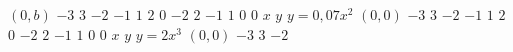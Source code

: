 \documentclass{article}
\begin{document}
$(0,b)$%
\stopmpxshipout
\mpxshipout%
$\num{-3}$%
\stopmpxshipout
\mpxshipout%
$\num{3}$%
\stopmpxshipout
\mpxshipout%
$\num{-2}$%
\stopmpxshipout
\mpxshipout%
$\num{-1}$%
\stopmpxshipout
\mpxshipout%
$\num{1}$%
\stopmpxshipout
\mpxshipout%
$\num{2}$%
\stopmpxshipout
\mpxshipout%
$\num{0}$%
\stopmpxshipout
\mpxshipout%
$\num{-2}$%
\stopmpxshipout
\mpxshipout%
$\num{2}$%
\stopmpxshipout
\mpxshipout%
$\num{-1}$%
\stopmpxshipout
\mpxshipout%
$\num{1}$%
\stopmpxshipout
\mpxshipout%
$\num{0}$%
\stopmpxshipout
\mpxshipout%
$\num{0}$%
\stopmpxshipout
\mpxshipout%
$x$%
\stopmpxshipout
\mpxshipout%
$y$%
\stopmpxshipout
\mpxshipout%
$y=0,07x^2$%
\stopmpxshipout
\mpxshipout%
$(0,0)$%
\stopmpxshipout
\mpxshipout%
$\num{-3}$%
\stopmpxshipout
\mpxshipout%
$\num{3}$%
\stopmpxshipout
\mpxshipout%
$\num{-2}$%
\stopmpxshipout
\mpxshipout%
$\num{-1}$%
\stopmpxshipout
\mpxshipout%
$\num{1}$%
\stopmpxshipout
\mpxshipout%
$\num{2}$%
\stopmpxshipout
\mpxshipout%
$\num{0}$%
\stopmpxshipout
\mpxshipout%
$\num{-2}$%
\stopmpxshipout
\mpxshipout%
$\num{2}$%
\stopmpxshipout
\mpxshipout%
$\num{-1}$%
\stopmpxshipout
\mpxshipout%
$\num{1}$%
\stopmpxshipout
\mpxshipout%
$\num{0}$%
\stopmpxshipout
\mpxshipout%
$\num{0}$%
\stopmpxshipout
\mpxshipout%
$x$%
\stopmpxshipout
\mpxshipout%
$y$%
\stopmpxshipout
\mpxshipout%
$y=2x^3$%
\stopmpxshipout
\mpxshipout%
$(0,0)$%
\stopmpxshipout
\mpxshipout%
$\num{-3}$%
\stopmpxshipout
\mpxshipout%
$\num{3}$%
\stopmpxshipout
\mpxshipout%
$\num{-2}$%
\stopmpxshipout
\mpxshipout%
\end{document}
